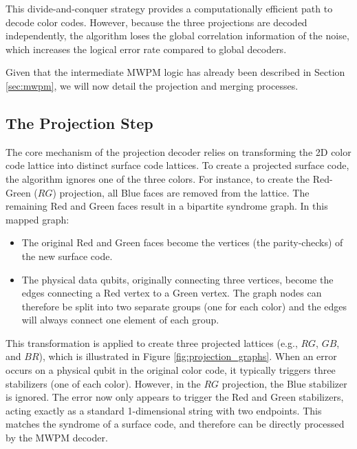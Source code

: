 This divide-and-conquer strategy provides a computationally efficient path to decode color codes. However, because the three projections are decoded independently, the algorithm loses the global correlation information of the noise, which increases the logical error rate compared to global decoders.

Given that the intermediate MWPM logic has already been described in Section \ref{sec:mwpm}, we will now detail the projection and merging processes. 

\subsection{The Projection Step}
 The core mechanism of the projection decoder relies on transforming the 2D color code lattice into distinct surface code lattices. To create a projected surface code, the algorithm ignores one of the three colors. For instance, to create the Red-Green ($RG$) projection, all Blue faces are removed from the lattice. The remaining Red and Green faces result in a bipartite syndrome graph. In this mapped graph:
\begin{itemize}
    \item The original Red and Green faces become the vertices (the parity-checks) of the new surface code.
    \item The physical data qubits, originally connecting three vertices, become the edges connecting a Red vertex to a Green vertex. The graph nodes can therefore be split into two separate groups (one for each color) and the edges will always connect one element of each group.
\end{itemize}
This transformation is applied to create three projected lattices (e.g., $RG$, $GB$, and $BR$), which is illustrated in Figure \ref{fig:projection_graphs}. When an error occurs on a physical qubit in the original color code, it typically triggers three stabilizers (one of each color). However, in the $RG$ projection, the Blue stabilizer is ignored. The error now only appears to trigger the Red and Green stabilizers, acting exactly as a standard 1-dimensional string with two endpoints. This matches the syndrome of a surface code, and therefore can be directly processed by the MWPM decoder. 

